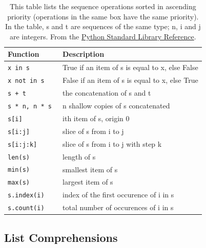 \begin{table}
\centering
\caption{%
This table lists the sequence operations sorted in ascending priority (operations in the same box have the same priority). In the table, s and t are sequences of the same type; n, i and j are integers. From the \href{http://docs.python.org/2/library/stdtypes.html\#sequence-types-str-unicode-list-tuple-bytearray-buffer-xrange}{Python Standard Library Reference}.
}

\label{tab:listMethods}       %
\begin{tabular}{ll}
\toprule
Function\hspace*{7mm} & Description  \\
\midrule
\texttt{x in s	 		}	& 	True if an item of s is equal to x, else False	\\
\texttt{x not in s		}	& 	False if an item of s is equal to x, else True	\\
\texttt{s + t			}	&	the concatenation of s and t	\\
\texttt{s * n, n * s	}	& 	n shallow copies of s concatenated\\	
\texttt{s[i]			}	&   ith item of s, origin 0	\\
\texttt{s[i:j]			}	&   slice of s from i to j	\\
\texttt{s[i:j:k]		}	&   slice of s from i to j with step k\\
\texttt{len(s)			}	&	length of s	 \\
\texttt{min(s)			}	&	smallest item of s\\ 
\texttt{max(s)			}	&	largest item of s\\ 
\texttt{s.index(i)		}	&	index of the first occurence of i in s\\ 
\texttt{s.count(i)		}	&	total number of occurences of i in s\\
\bottomrule
\end{tabular}
\end{table}
%
\subsection{List Comprehensions}
\label{sec:listComprehensions}

